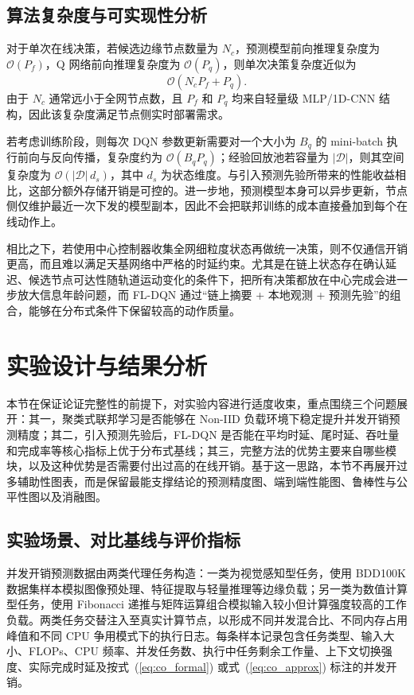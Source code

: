 \subsection{算法复杂度与可实现性分析}

对于单次在线决策，若候选边缘节点数量为 $N_c$，预测模型前向推理复杂度为 $\mathcal{O}(P_f)$，Q 网络前向推理复杂度为 $\mathcal{O}(P_q)$，则单次决策复杂度近似为
\begin{equation}
\mathcal{O}\left(N_c P_f + P_q\right).
\end{equation}
由于 $N_c$ 通常远小于全网节点数，且 $P_f$ 和 $P_q$ 均来自轻量级 MLP/1D-CNN 结构，因此该复杂度满足节点侧实时部署需求。

若考虑训练阶段，则每次 DQN 参数更新需要对一个大小为 $B_q$ 的 mini-batch 执行前向与反向传播，复杂度约为 $\mathcal{O}(B_q P_q)$；经验回放池若容量为 $|\mathcal{D}|$，则其空间复杂度为 $\mathcal{O}(|\mathcal{D}|\,d_s)$，其中 $d_s$ 为状态维度。与引入预测先验所带来的性能收益相比，这部分额外存储开销是可控的。进一步地，预测模型本身可以异步更新，节点侧仅维护最近一次下发的模型副本，因此不会把联邦训练的成本直接叠加到每个在线动作上。

相比之下，若使用中心控制器收集全网细粒度状态再做统一决策，则不仅通信开销更高，而且难以满足天基网络中严格的时延约束。尤其是在链上状态存在确认延迟、候选节点可达性随轨道运动变化的条件下，把所有决策都放在中心完成会进一步放大信息年龄问题，而 FL-DQN 通过“链上摘要 + 本地观测 + 预测先验”的组合，能够在分布式条件下保留较高的动作质量。


\section{实验设计与结果分析}
\label{sec:experiments}
本节在保证论证完整性的前提下，对实验内容进行适度收束，重点围绕三个问题展开：其一，聚类式联邦学习是否能够在 Non-IID 负载环境下稳定提升并发开销预测精度；其二，引入预测先验后，FL-DQN 是否能在平均时延、尾时延、吞吐量和完成率等核心指标上优于分布式基线；其三，完整方法的优势主要来自哪些模块，以及这种优势是否需要付出过高的在线开销。基于这一思路，本节不再展开过多辅助性图表，而是保留最能支撑结论的预测精度图、端到端性能图、鲁棒性与公平性图以及消融图。


\subsection{实验场景、对比基线与评价指标}

并发开销预测数据由两类代理任务构造：一类为视觉感知型任务，使用 BDD100K 数据集样本模拟图像预处理、特征提取与轻量推理等边缘负载；另一类为数值计算型任务，使用 Fibonacci 递推与矩阵运算组合模拟输入较小但计算强度较高的工作负载。两类任务交替注入至真实计算节点，以形成不同并发混合比、不同内存占用峰值和不同 CPU 争用模式下的执行日志。每条样本记录包含任务类型、输入大小、FLOPs、CPU 频率、并发任务数、执行中任务剩余工作量、上下文切换强度、实际完成时延及按式~(\ref{eq:co_formal}) 或式~(\ref{eq:co_approx}) 标注的并发开销。


